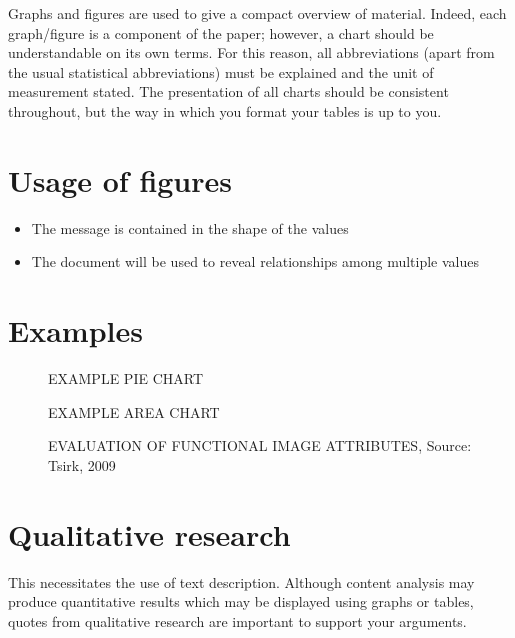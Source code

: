 Graphs and figures are used to give a compact overview of material. Indeed, each graph/figure is a component of the paper; however, a chart should be understandable on its own terms. 
For this reason, all abbreviations (apart from the usual statistical abbreviations) must be explained and the unit of measurement stated. 
The presentation of all charts should be consistent throughout, but the way in which you format your tables is up to you. 


\section{Usage of figures}
\label{sec:figures}

\begin{itemize}
\item The message is contained in the shape of the values
\item The document will be used to reveal relationships among multiple values 
\end{itemize}

 
\section{Examples}
\label{sec:figuresExamples}

\begin{figure}[!htb]
       \caption{\label{fig:piechart} EXAMPLE PIE CHART}
\end{figure}

\begin{figure}[!htb]
        \caption{\label{fig:areachart} EXAMPLE AREA CHART}
\end{figure}

\begin{figure}[!htb]
        \caption{\label{fig:linechart} EVALUATION OF FUNCTIONAL IMAGE ATTRIBUTES, Source: Tsirk, 2009}
\end{figure}      

\section{Qualitative research}
\label{sec:qualitativeresearchs}

This necessitates the use of text description. Although content analysis may produce quantitative results which may be displayed using graphs or tables, quotes from qualitative research are important to support your arguments. 

